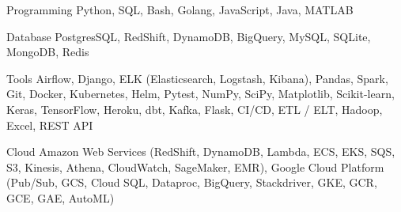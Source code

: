 

\begin{cvskills}

  \cvskill
    {Programming} %
    {Python, SQL, Bash, Golang, JavaScript, Java, MATLAB} %

  \cvskill
    {Database} %
    {PostgresSQL, RedShift, DynamoDB, BigQuery, MySQL, SQLite, MongoDB, Redis} %

  \cvskill
    {Tools} %
    {Airflow, Django, ELK (Elasticsearch, Logstash, Kibana), Pandas, Spark, Git, Docker, Kubernetes, Helm, Pytest, NumPy, SciPy, Matplotlib, Scikit-learn, Keras, TensorFlow, Heroku, dbt, Kafka, Flask, CI/CD, ETL / ELT, Hadoop, Excel, REST API} %






  \cvskill
    {Cloud} %
    {Amazon Web Services (RedShift, DynamoDB, Lambda, ECS, EKS, SQS, S3, Kinesis, Athena, CloudWatch, SageMaker, EMR),
    Google Cloud Platform (Pub/Sub, GCS, Cloud SQL, Dataproc, BigQuery, Stackdriver, GKE, GCR, GCE, GAE, AutoML)} 


\end{cvskills}
